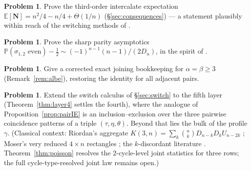 \documentclass[11pt]{article}
\theoremstyle{definition}
\newtheorem{problem}[theorem]{Problem}
\newcommand{\E}{\mathbb{E}}
\renewcommand{\Pr}{\mathbb{P}}
\begin{document}
\begin{problem}
Prove the third-order intercalate expectation
$\E[\mathbf N]=n^2/4-n/4+\Theta(1/n)$ (\S\ref{sec:consequences}) --- a
statement plausibly within reach of the switching methods of \cite{McKW99}.
\end{problem}

\begin{problem}
Prove the sharp parity asymptotics
$\Pr(\sigma_{1,2}\text{ even})-\tfrac12\sim(-1)^{n-1}(n-1)/(2D_n)$, in the
spirit of \cite{KPS25}.
\end{problem}

\begin{problem}
Give a corrected exact joining bookkeeping for $\alpha=\beta\ge3$
(Remark~\ref{rem:albe}), restoring the identity for all adjacent pairs.
\end{problem}

\begin{problem}
Extend the switch calculus of \S\ref{sec:switch} to the fifth layer
(Theorem~\ref{thm:layer4} settles the fourth), where the
analogue of Proposition~\ref{prop:pairIE} is an inclusion--exclusion over
the three pairwise coincidence patterns of a triple $(\tau,\eta,\theta)$.
Beyond that lies the bulk of the profile $\gamma$.  (Classical context:
Riordan's aggregate $K(3,n)=\sum_k\binom nkD_{n-k}D_kU_{n-2k}$
\cite[Ch.~8, eq.~(30a)]{Riordan58}; Moser's very reduced $4\times n$
rectangles \cite{Moser67}; the $k$-discordant literature
\cite{Whitehead79}.  Theorem~\ref{thm:poisson} resolves the
$2$-cycle-level joint statistics for three rows; the full
cycle-type-resolved joint law remains open.)
\end{problem}
\end{document}
